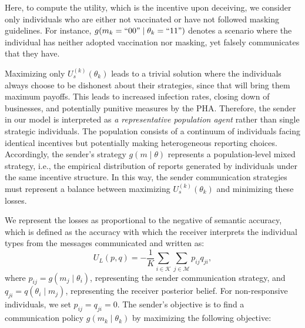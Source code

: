 \documentclass[sigconf,review]{acmart}
\begin{document}

Here, to compute the utility, which is the incentive upon deceiving, we consider only individuals who are either not vaccinated or have not followed masking guidelines. For instance, \( g(m_k = ``00" \mid \theta_k=``11") \) denotes a scenario where the individual has neither adopted vaccination nor masking, yet falsely communicates that they have. 

Maximizing only $U_s^{(k)}(\theta_k)$ leads to a trivial solution where the individuals always choose to be dishonest about their strategies, since that will bring them maximum payoffs. %
This leads to increased infection rates, closing down of businesses, and potentially punitive measures by the PHA.
Therefore, the sender in our model is interpreted as \emph{a representative population agent} rather than single strategic individuals. The population consists of a continuum of individuals facing identical incentives but potentially making heterogeneous reporting choices. Accordingly, the sender’s strategy $g(m \mid \theta)$ represents a population-level mixed strategy, i.e., the empirical distribution of reports generated by individuals under the same incentive structure. In this way, the sender communication strategies must represent a balance between maximizing $U_s^{(k)}(\theta_k)$ and minimizing these losses. 

We represent the losses as proportional to the negative of semantic accuracy, which is defined as the accuracy with which the receiver interprets the individual types from the messages communicated and written as:
\begin{equation}
U_L(p, q) = -\frac{1}{K} \sum\limits_{i \in \mathcal{K}} \sum\limits_{j \in \mathcal{M}} p_{ij} q_{ji},
\end{equation}
where $p_{ij} = g(m_j \mid \theta_i)$, representing the sender communication strategy, and $q_{ji} = q(\theta_i \mid m_j)$, representing the receiver posterior belief. For non-responsive individuals, we set $p_{ij} = q_{ji} = 0$.
The sender's objective is to find a communication policy $g(m_k \mid \theta_k)$ by maximizing the following objective:
\end{document}
